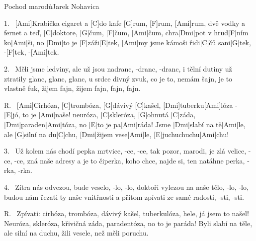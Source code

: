 \begin{song}{Pochod marodů}{Jarek Nohavica}

\begin{xverse}{1.~}
[\large Ami]Krabička cigaret a [\large C]do kafe [\large G]rum, [\large F]rum, [\large Ami]rum,
dvě vodky a fernet a teď, [\large C]doktore, [\large G]{čum}, [\large F]{čum}, [\large Ami]{čum},
chra[\large Dmi]pot v hrud[\large F]ním ko[\large Ami]{ši}, no [\large Dmi]to je [\large F]záži[\large E]tek,
[\large Ami]my jsme kámoši řidi[\large C]{čů} sani[\large G]tek, -[\large F]tek, -[\large Ami]tek.
\end{xverse}


\begin{xverse}{2.~}
Měli jsme ledviny, ale už jsou nadranc, -dranc, -dranc,
i tělní dutiny už ztratily glanc, glanc, glanc,
u srdce divný zvuk, co je to, nemám šajn,
je to vlastně fuk, žijem fajn, žijem fajn, fajn, fajn.
\end{xverse}


\begin{xverse}{R.~}
[\large Ami]Cirhóza, [\large C]trombóza, [\large G]dávivý [\large C]kašel,
[\large Dmi]tuberku[\large Ami]lóza - [\large E]jó, to je [\large Ami]naše!
neuróza, [\large C]skleróza, [\large G]ohnutá [\large C]záda,
[\large Dmi]paraden[\large Ami]tóza, no [\large E]to je pa[\large Ami]ráda!
Jsme [\large Dmi]slabí na tě[\large Ami]le, ale [\large G]silní na du[\large C]chu,
[\large Dmi]{ži}jem vese[\large Ami]le, [\large E]juchuchuchu[\large Ami]chu!
\end{xverse}


\begin{xverse}{3.~}
Už kolem nás chodí pepka mrtvice, -ce, -ce,
tak pozor, marodi, je zlá velice, -ce, -ce,
zná naše adresy a je to čiperka,
koho chce, najde si, ten natáhne perka, -rka, -rka.
\end{xverse}


\begin{xverse}{4.~}
Zítra nás odvezou, bude veselo, -lo, -lo,
doktoři vylezou na naše tělo, -lo, -lo,
budou nám řezati ty naše vnitřnosti
a přitom zpívati ze samé radosti, -sti, -sti.
\end{xverse}


\begin{xverse}{R.~}
Zpívati: cirhóza, trombóza, dávivý kašel,
tuberkulóza, hele, já jsem to našel!
Neuróza, skleróza, křivičná záda,
paradentóza, no to je paráda!
Byli slabí na těle, ale silní na duchu,
žili vesele, než měli poruchu.
\end{xverse}

\end{song}

